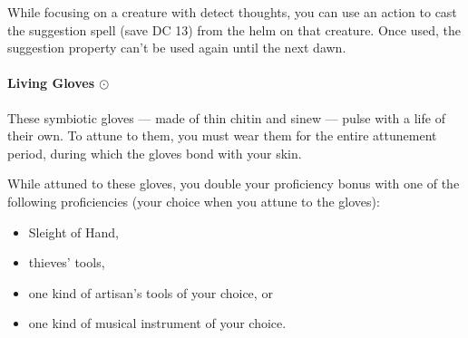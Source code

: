         While focusing on a creature with detect thoughts, you can use an action to cast the suggestion spell (save DC 13) from the helm on that creature.
        Once used, the suggestion property can't be used again until the next dawn.
    \paragraph{Living Gloves $\odot$}
        These symbiotic gloves --- made of thin chitin and sinew --- pulse with a life of their own.
        To attune to them, you must wear them for the entire attunement period, during which the gloves bond with your skin.

        While attuned to these gloves, you double your proficiency bonus with one of the following proficiencies (your choice when you attune to the gloves):
        \begin{itemize}
            \item Sleight of Hand,
            \item thieves' tools,
            \item one kind of artisan's tools of your choice, or
            \item one kind of musical instrument of your choice.
        \end{itemize}

